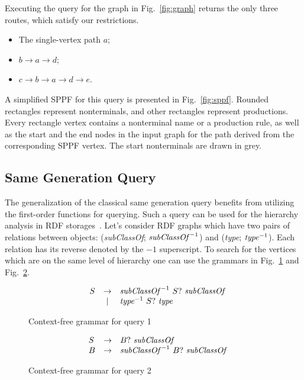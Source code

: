 Executing the query for the graph in Fig.~\ref{fig:graph} returns the only three routes, which satisfy our restrictions.

\begin{itemize}
\item The single-vertex path $a$;
\item $b \rightarrow a \rightarrow d$;
\item $c \rightarrow b \rightarrow a \rightarrow d \rightarrow e$.
\end{itemize}

A simplified SPPF for this query is presented in Fig.~\ref{fig:sppf}. Rounded rectangles represent nonterminals, and other rectangles represent productions.
Every rectangle vertex contains a nonterminal name or a production rule, as well as the start and the end nodes in the input graph for the path derived from the corresponding SPPF vertex.
The start nonterminals are drawn in grey.

\subsection{Same Generation Query}

The generalization of the classical same generation query benefits from utilizing the first-order functions for querying.
Such a query can be used for the hierarchy analysis in RDF storages~\cite{CFGonRDF}.
Let's consider RDF graphs which have two pairs of relations between objects: (\emph{subClassOf}; $\text{\emph{subClassOf}}^{-1}$) and (\emph{type}; $\text{\emph{type}}^{-1}$). Each relation has its reverse denoted by the $-1$ superscript.
To search for the vertices which are on the same level of hierarchy one can use the grammars in Fig.~\ref{grammarQ1} and Fig.~\ref{grammarQ2}.

\begin{figure}[h]
   \centering
   \[
\begin{array}{rlcl}
   & S &  \rightarrow & \text{\textit{subClassOf}}^{-1} \ S? \ \text{\textit{subClassOf}} \\
   &   & |            & \text{\textit{type}}^{-1} \ S? \ \text{\textit{type}} \\
\end{array}
\]
   \caption{Context-free grammar for query 1}
   \label{grammarQ1}
   \end{figure}

\begin{figure}[h]
   \centering
   \[
\begin{array}{rlcl}
   & S & \rightarrow & B? \ \text{\textit{subClassOf}} \\
   & B & \rightarrow & \text{\textit{subClassOf}}^{-1} \ B? \ \text{\textit{subClassOf}} \\
\end{array}
\]
   \caption{Context-free grammar for query 2}
   \label{grammarQ2}
   \end{figure}

